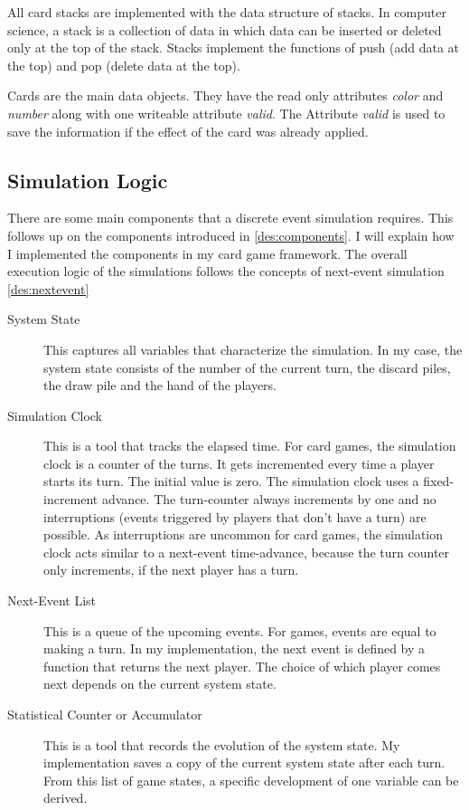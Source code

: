 All card stacks are implemented with the data structure of stacks. In computer science, a stack is a collection of data in which data can be inserted or deleted only at the top of the stack. \cite[page 86]{patel2018data}
Stacks implement the functions of push (add data at the top) and pop (delete data at the top).

Cards are the main data objects. They have the read only attributes \textit{color} and \textit{number} along with one writeable attribute \textit{valid}.
The Attribute \textit{valid} is used to save the information if the effect of the card was already applied.


\subsection{Simulation Logic}


There are some main components that a discrete event simulation requires.
This follows up on the components introduced in \ref{des:components}. I will explain how I implemented the components in my card game framework.
The overall execution logic of the simulations follows the concepts of next-event simulation \ref{des:nextevent}

\begin{description}
\item[System State] This captures all variables that characterize the simulation. In my case, the system state consists of the number of the current turn, the discard piles, the draw pile and the hand of the players.

\item[Simulation Clock] This is a tool that tracks the elapsed time. For card games, the simulation clock is a counter of the turns. It gets incremented every time a player starts its turn. The initial value is zero. The simulation clock uses a fixed-increment advance. The turn-counter always increments by one and no interruptions (events triggered by players that don't have a turn) are possible. As interruptions are uncommon for card games, the simulation clock acts similar to a next-event time-advance, because the turn counter only increments, if the next player has a turn.

\item[Next-Event List] This is a queue of the upcoming events. For games, events are equal to making a turn. In my implementation, the next event is defined by a function that returns the next player. The choice of which player comes next depends on the current system state.

\item[Statistical Counter or Accumulator] This is a tool that records the evolution of the system state. My implementation saves a copy of the current system state after each turn. From this list of game states, a specific development of one variable can be derived.

\end{description}

